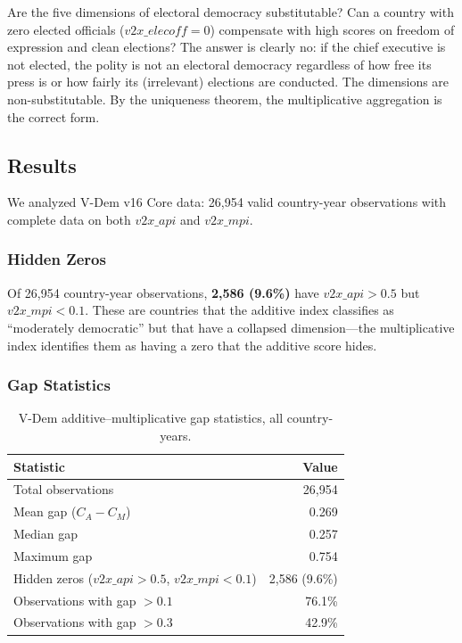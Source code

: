 \documentclass[12pt]{article}
\begin{document}
Are the five dimensions of electoral democracy substitutable? Can a country with zero elected officials ($v2x\_elecoff = 0$) compensate with high scores on freedom of expression and clean elections? The answer is clearly no: if the chief executive is not elected, the polity is not an electoral democracy regardless of how free its press is or how fairly its (irrelevant) elections are conducted. The dimensions are non-substitutable. By the uniqueness theorem, the multiplicative aggregation is the correct form.

\subsection{Results}

We analyzed V-Dem v16 Core data: 26,954 valid country-year observations with complete data on both $v2x\_api$ and $v2x\_mpi$.

\subsubsection{Hidden Zeros}

Of 26,954 country-year observations, \textbf{2,586 (9.6\%)} have $v2x\_api > 0.5$ but $v2x\_mpi < 0.1$. These are countries that the additive index classifies as ``moderately democratic'' but that have a collapsed dimension---the multiplicative index identifies them as having a zero that the additive score hides.

\subsubsection{Gap Statistics}

\begin{table}[h]
\centering
\begin{tabular}{@{}lr@{}}
\toprule
Statistic & Value \\
\midrule
Total observations & 26,954 \\
Mean gap ($C_A - C_M$) & 0.269 \\
Median gap & 0.257 \\
Maximum gap & 0.754 \\
Hidden zeros ($v2x\_api > 0.5$, $v2x\_mpi < 0.1$) & 2,586 (9.6\%) \\
Observations with gap $> 0.1$ & 76.1\% \\
Observations with gap $> 0.3$ & 42.9\% \\
\bottomrule
\end{tabular}
\caption{V-Dem additive--multiplicative gap statistics, all country-years.}
\label{tab:vdem_summary}
\end{table}
\end{document}
